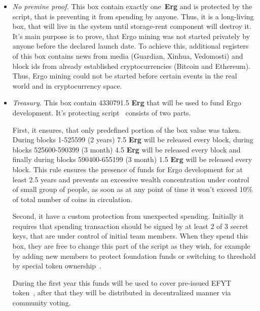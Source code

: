 \documentclass[]{article}
\newcommand{\Ergo}{Ergo}
\newcommand{\Erg}{\textbf{Erg}}
\begin{document}
    \begin{itemize}
        \item{\em No premine proof.} This box contain exactly one~\Erg{} and is protected by the script,
        that is preventing it from spending by anyone.
        Thus, it is a long-living box, that will live in the system until storage-rent component will
        destroy it.
        It's main purpose is to prove, that \Ergo{} mining was not started privately by anyone before
        the declared launch date.
        To achieve this, additional registers of this box contains news from media (Guardian, Xinhua, Vedomosti)
        and block ids from already established cryptocurrencies (Bitcoin and Ethereum).
        Thus, \Ergo{} mining could not be started before certain events in the real world and in
        cryptocurrency space.

        \item{\em Treasury.} This box contain 4330791.5 \Erg{} that will be used to fund \Ergo{}
        development.
        It's protecting script~\cite{link to corresponding ergo tree} consists of two parts.

        First, it ensures, that only predefined portion of the box value was taken.
        During blocks 1-525599 (2 years) 7.5 \Erg{} will be released every block,
        during blocks 525600-590399 (3 month) 4.5 \Erg{} will be released every block and finally
        during blocks 590400-655199 (3 month) 1.5 \Erg{} will be released every block.
        This rule ensures the presence of funds for \Ergo{} development for at least 2.5 years and
        prevents an excessive wealth concentration under control of small group of people, as soon
        as at any point of time it won't exceed 10\% of total number of coins in circulation.

        Second, it have a custom protection from unexpected spending.
        Initially it requires that spending transaction should be signed by at least 2 of 3 secret keys,
        that are under control of initial team members. When they spend this box, they are free to
        change this part of the script as they wish, for example by adding new members to protect foundation
        funds or switching to threshold by special token ownership~\cite{link to ...}.

        During the first year this funds will be used to cover pre-issued EFYT token~\cite{our website},
        after that they will be distributed in decentralized manner via community voting.



\end{itemize}
\end{document}
